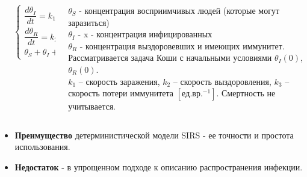 \documentclass[
    11pt, %
    aspectratio=169, %
]{beamer}
\begin{document}
\begin{frame}
    \vspace{-0.25cm}
    \begin{columns}[c] %
        \begin{column}{0.05\textwidth}
        \end{column}
        \begin{column}{0.25\textwidth}
            \renewcommand{\arraystretch}{1.5}
            \hspace*{\fill}
            $$
            \left\{
            \begin{array}{l}
                \dfrac{d \theta_{\mathit{I}}}{d t}=k_{1} \theta_{\mathit{I}} \theta_{\mathit{S}}-k_{2} \theta_{\mathit{I}} \\[6pt]
                \dfrac{d \theta_{\mathit{R}}}{d t}=k_{2} \theta_{\mathit{I}}-k_{3} \theta_{\mathit{R}} \\
                \theta_{\mathit{S}}+\theta_{\mathit{I}}+\theta_{\mathit{R}}=1
            \end{array}
            \right.
            $$
            \hspace*{\fill}
        \end{column}
        \begin{column}{0.7\textwidth}
            $\theta_{\mathit{S}}$ - концентрация восприимчивых людей (которые могут заразиться)\\
            $\theta_{\mathit{I}}$ - x - концентрация инфицированных \\
            $\theta_{\mathit{R}}$ - концентрация выздоровевших и имеющих иммунитет.\\
            Рассматривается задача Коши с начальными условиями $\theta_{\mathit{I}}(0)$, $\theta_{\mathit{R}}(0)$. \\
            $k_1$ – скорость заражения, $k_2$ – скорость выздоровления, $k_3$ – скорость потери иммунитета $[ед.вр.^{-1}]$. Смертность не учитывается.
        \end{column}
	\end{columns}

    \vspace{-0.25cm}
    \begin{itemize}
        \item \textbf{Преимущество} детерминистической модели SIRS - ее точности и  простота использования.
        \item \textbf{Недостаток} - в упрощенном подходе к описанию распространения инфекции.
    \end{itemize} 


\end{frame}
\end{document}
